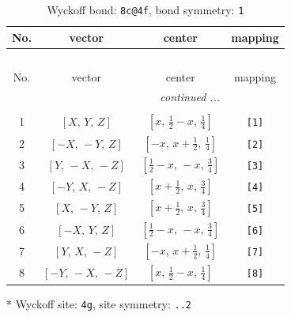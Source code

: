 \documentclass[fleqn,8pt]{jsarticle}
\begin{document}
\renewcommand{\arraystretch}{1.2}
\begin{longtable}{cccc}
\caption{Wyckoff bond: {\tt 8c@4f}, bond symmetry: {\tt 1}}
 \\
 \hline \hline
No. & vector & center & mapping \\ \hline \endfirsthead

\multicolumn{3}{l}{\tablename\ \thetable{}} \\
 \hline \hline
No. & vector & center & mapping \\ \hline \endhead

 \hline \hline
\multicolumn{3}{r}{\footnotesize\it continued ...} \\ \endfoot

 \hline \hline
\multicolumn{3}{r}{} \\ \endlastfoot

1 & $\left[ X,\, Y,\, Z \right]$ & $\left[ x,\, \frac{1}{2} - x,\, \frac{1}{4} \right]$ & {\tt [1]} \\ \hline
2 & $\left[ - X,\, - Y,\, Z \right]$ & $\left[ - x,\, x + \frac{1}{2},\, \frac{1}{4} \right]$ & {\tt [2]} \\ \hline
3 & $\left[ Y,\, - X,\, - Z \right]$ & $\left[ \frac{1}{2} - x,\, - x,\, \frac{3}{4} \right]$ & {\tt [3]} \\ \hline
4 & $\left[ - Y,\, X,\, - Z \right]$ & $\left[ x + \frac{1}{2},\, x,\, \frac{3}{4} \right]$ & {\tt [4]} \\ \hline
5 & $\left[ X,\, - Y,\, Z \right]$ & $\left[ x + \frac{1}{2},\, x,\, \frac{3}{4} \right]$ & {\tt [5]} \\ \hline
6 & $\left[ - X,\, Y,\, Z \right]$ & $\left[ \frac{1}{2} - x,\, - x,\, \frac{3}{4} \right]$ & {\tt [6]} \\ \hline
7 & $\left[ Y,\, X,\, - Z \right]$ & $\left[ - x,\, x + \frac{1}{2},\, \frac{1}{4} \right]$ & {\tt [7]} \\ \hline
8 & $\left[ - Y,\, - X,\, - Z \right]$ & $\left[ x,\, \frac{1}{2} - x,\, \frac{1}{4} \right]$ & {\tt [8]} \\
\end{longtable}
* Wyckoff site: {\tt 4g}, site symmetry: {\tt ..2}
\renewcommand{\arraystretch}{1.2}
\end{document}
